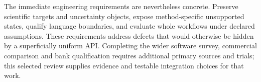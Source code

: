 The immediate engineering requirements are nevertheless concrete. Preserve
scientific targets and uncertainty objects, expose method-specific unsupported
states, qualify language boundaries, and evaluate whole workflows under
declared assumptions. These requirements address defects that would otherwise
be hidden by a superficially uniform API. Completing the wider software
survey, commercial comparison and bank qualification requires additional
primary sources and trials; this selected review supplies evidence and
testable integration choices for that work.



